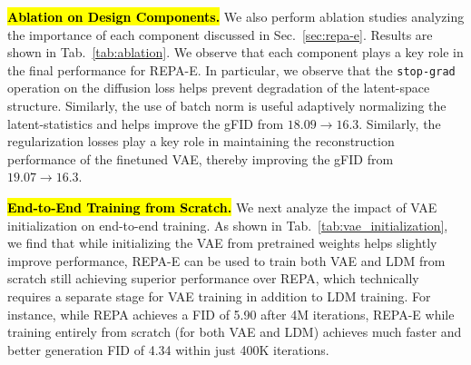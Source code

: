 \documentclass[10pt,twocolumn,letterpaper]{article}
\begin{document}
\hl{\textbf{Ablation on Design Components.}}
We also perform ablation studies analyzing the importance of each component discussed in Sec.~\ref{sec:repa-e}. Results are shown in Tab.~\ref{tab:ablation}. We observe that each component plays a key role in the final performance for REPA-E. In particular, we observe that the \texttt{stop-grad} operation on the diffusion loss helps prevent degradation of the latent-space structure. Similarly, the use of batch norm is useful adaptively normalizing the latent-statistics and helps improve the gFID from $18.09 \rightarrow 16.3$. Similarly, the regularization losses play a key role in maintaining the reconstruction performance of the finetuned VAE, thereby improving the gFID from $19.07 \rightarrow 16.3$.

\hl{\textbf{End-to-End Training from Scratch.}} We next analyze the impact of VAE initialization on end-to-end training. As shown in Tab.~\ref{tab:vae_initialization}, we find that while initializing the VAE from pretrained weights helps slightly improve performance, REPA-E can be used to train both VAE and LDM from scratch still achieving superior performance over REPA, which technically requires a separate stage for VAE training in addition to LDM training. For instance, while REPA achieves a FID of 5.90 after 4M iterations, REPA-E while training entirely from scratch (for both VAE and LDM) achieves much faster and better generation FID of 4.34 within just 400K iterations.
\end{document}
